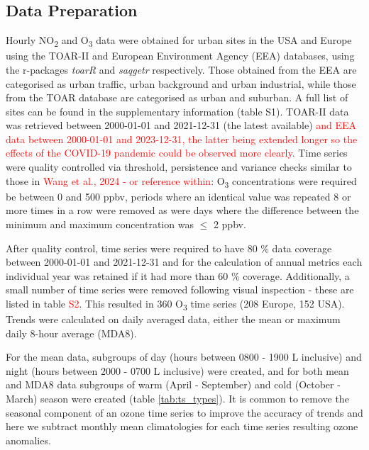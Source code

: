 \documentclass[journal abbreviation, manuscript]{copernicus}
\begin{document}
\subsection{Data Preparation} \label{sect:data_prep}
Hourly NO\textsubscript{2} and O\textsubscript{3} data were obtained for urban sites in the USA and Europe using the TOAR-II \citep{toar_db} and European Environment Agency (EEA) \citep{eea_1, eea_2} databases, using the r-packages \emph{toarR} \citep{drysdale_2024_14537446} and \emph{saqgetr} \citep{saqgetr} respectively. Those obtained from the EEA are categorised as urban traffic, urban background and urban industrial, while those from the TOAR database are categorised as urban and suburban. A full list of sites can be found in the supplementary information (table S1).  TOAR-II data was retrieved between 2000-01-01 and 2021-12-31 (the latest available) \textcolor{red}{and EEA data between 2000-01-01 and 2023-12-31, the latter being extended longer so the effects of the COVID-19 pandemic could be observed more clearly.} Time series were quality controlled via threshold, persistence and variance checks similar to those in \textcolor{red}{Wang et al., 2024 - or reference within}: O\textsubscript{3} concentrations were required be between 0 and 500 ppbv, periods where an identical value was repeated 8 or more times in a row were removed as were days where the difference between the minimum and maximum concentration was $\leq$ 2 ppbv. 

After quality control, time series were required to have 80 \% data coverage between 2000-01-01 and 2021-12-31 and for the calculation of annual metrics each individual year was retained if it had more than 60 \% coverage. Additionally, a small number of time series were removed following visual inspection - these are listed in table \textcolor{red}{S2}. This resulted in 360 O\textsubscript{3} time series (208 Europe, 152 USA). Trends were calculated on daily averaged data, either the mean or maximum daily 8-hour average (MDA8). 

For the mean data, subgroups of day (hours between 0800 - 1900 L inclusive) and night (hours between 2000 - 0700 L inclusive) were created, and for both mean and MDA8 data subgroups of warm (April - September) and cold (October - March) season were created (table \ref{tab:ts_types}). It is common to remove the seasonal component of an ozone time series to improve the accuracy of trends \citep{cooper_2020} and here we subtract monthly mean climatologies for each time series resulting ozone anomalies. 
\end{document}
